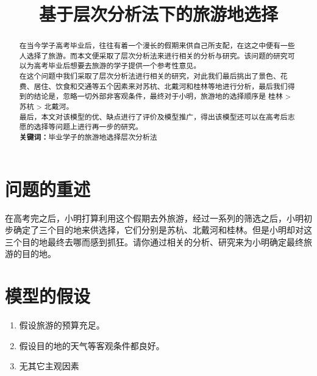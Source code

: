 \documentclass[a4paper]{article}
\title{基于层次分析法下的旅游地选择}
\date{}
\begin{document}
    \maketitle
    \begin{abstract}
        在当今学子高考毕业后，往往有着一个漫长的假期来供自己所支配，在这之中便有一些人选择了旅游。而本文便采取了层次分析法来进行相关的分析与研究。该问题的研究可以为高考毕业后想要去旅游的学子提供一个参考性意见。
        \\
        
        在这个问题中我们采取了层次分析法进行相关的研究，对此我们最后挑出了景色、花费、居住、饮食和交通等五个因素来对苏杭、北戴河和桂林等地进行分析，最后我们得到的结论是，忽略一切外部非客观条件，最终对于小明，旅游地的选择顺序是 桂林 > 苏杭 > 北戴河。
        \\
         
        最后，本文对该模型的优、缺点进行了评价及模型推广，得出该模型还可以在高考后志愿的选择等问题上进行再一步的研究。\vspace{250pt}
        \\
        \textbf{关键词：}毕业学子的旅游地选择\quad 层次分析法
    \end{abstract}
    
    \newpage 
    \section{问题的重述}
    在高考完之后，小明打算利用这个假期去外旅游，经过一系列的筛选之后，小明初步确定了三个目的地来供选择，它们分别是苏杭、北戴河和桂林。但是小明却对这三个目的地最终去哪而感到抓狂。请你通过相关的分析、研究来为小明确定最终旅游的目的地。
    \section{模型的假设}
    \begin{enumerate}
        \item 假设旅游的预算充足。
        \item 假设目的地的天气等客观条件都良好。
        \item 无其它主观因素
    \end{enumerate}
\end{document}
